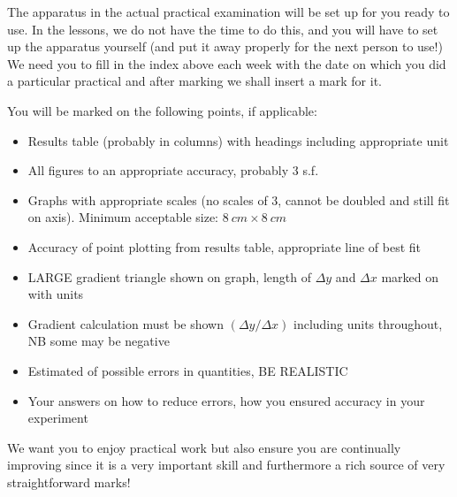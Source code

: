 \documentclass[a4paper,12pt,twoside]{exam}
\begin{document}
The apparatus in the actual practical examination will be set up for you ready to use.  In the lessons, we do not have the time to do this, and you will have to set up the apparatus yourself (and put it away properly for the next person to use!)  We need you to fill in the index above each week with the date on which you did a particular practical and after marking we shall insert a mark for it.

You will be marked on the following points, if applicable:
\begin{itemize}
\setlength{\itemsep}{1pt}
  \setlength{\parskip}{0pt}
  \setlength{\parsep}{0pt}
\item Results table (probably in columns) with headings including appropriate unit
\item All figures to an appropriate accuracy, probably 3 s.f.
\item Graphs with appropriate scales (no scales of 3, cannot be doubled and still fit on axis). Minimum acceptable size: $\SI{8}{cm}\times\SI{8}{cm}$
\item Accuracy of point plotting from results table, appropriate line of best fit
\item LARGE gradient triangle shown on graph, length of $\Delta y$ and $\Delta x$ marked on with units
\item Gradient calculation must be shown $(\Delta y/\Delta x)$ including units throughout, NB some may be negative
\item Estimated of possible errors in quantities, BE REALISTIC
\item Your answers on how to reduce errors, how you ensured accuracy in your experiment
\end{itemize}

We want you to enjoy practical work but also ensure you are continually improving since it is a very important skill and furthermore a rich source of very straightforward marks!

\normalsize

\cleardoublepage


\cleardoublepage



\cleardoublepage



\cleardoublepage


\end{document}
